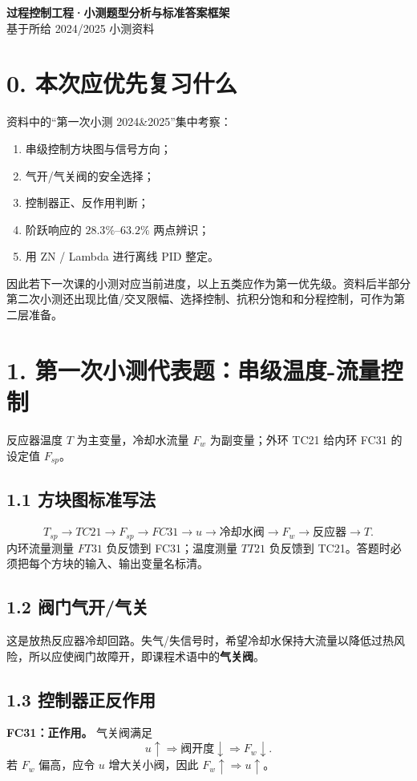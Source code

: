 \documentclass[UTF8,a4paper,10.5pt]{ctexart}
\begin{document}
\begin{center}
{\LARGE\bfseries 过程控制工程·小测题型分析与标准答案框架}\\[4pt]
{\large 基于所给 2024/2025 小测资料}
\end{center}

\section*{0. 本次应优先复习什么}
资料中的“第一次小测 2024\&2025”集中考察：
\begin{enumerate}[leftmargin=2em,itemsep=2pt]
\item 串级控制方块图与信号方向；
\item 气开/气关阀的安全选择；
\item 控制器正、反作用判断；
\item 阶跃响应的 $28.3\%$--$63.2\%$ 两点辨识；
\item 用 ZN / Lambda 进行离线 PID 整定。
\end{enumerate}
因此若下一次课的小测对应当前进度，以上五类应作为第一优先级。资料后半部分第二次小测还出现比值/交叉限幅、选择控制、抗积分饱和和分程控制，可作为第二层准备。

\section*{1. 第一次小测代表题：串级温度-流量控制}
反应器温度 $T$ 为主变量，冷却水流量 $F_w$ 为副变量；外环 TC21 给内环 FC31 的设定值 $F_{sp}$。

\subsection*{1.1 方块图标准写法}
\[
T_{sp}\rightarrow \boxed{TC21}\rightarrow F_{sp}
\rightarrow \boxed{FC31}\rightarrow u
\rightarrow \boxed{冷却水阀}\rightarrow F_w
\rightarrow \boxed{反应器}\rightarrow T.
\]
内环流量测量 $FT31$ 负反馈到 FC31；温度测量 $TT21$ 负反馈到 TC21。答题时必须把每个方块的输入、输出变量名标清。

\subsection*{1.2 阀门气开/气关}
这是放热反应器冷却回路。失气/失信号时，希望冷却水保持大流量以降低过热风险，所以应使阀门故障开，即课程术语中的\textbf{气关阀}。

\subsection*{1.3 控制器正反作用}
\textbf{FC31：正作用。}
气关阀满足
\[
u\uparrow\Rightarrow \text{阀开度}\downarrow\Rightarrow F_w\downarrow.
\]
若 $F_w$ 偏高，应令 $u$ 增大关小阀，因此 $F_w\uparrow\Rightarrow u\uparrow$。
\end{document}
